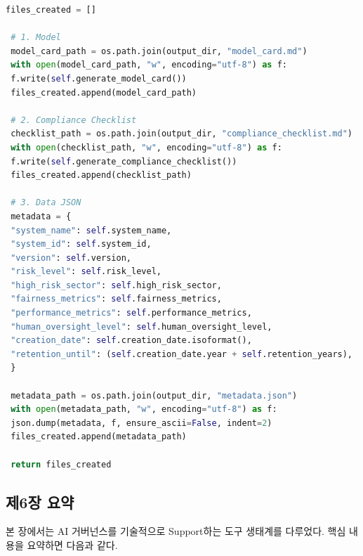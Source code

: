 \begin{lstlisting}[language=Python, caption={Integrated Documentation Automation System}, label={lst:documentation_automation}]
 files_created = []
 
 # 1. Model 
 model_card_path = os.path.join(output_dir, "model_card.md")
 with open(model_card_path, "w", encoding="utf-8") as f:
 f.write(self.generate_model_card())
 files_created.append(model_card_path)
 
 # 2. Compliance Checklist
 checklist_path = os.path.join(output_dir, "compliance_checklist.md")
 with open(checklist_path, "w", encoding="utf-8") as f:
 f.write(self.generate_compliance_checklist())
 files_created.append(checklist_path)
 
 # 3. Data JSON
 metadata = {
 "system_name": self.system_name,
 "system_id": self.system_id,
 "version": self.version,
 "risk_level": self.risk_level,
 "high_risk_sector": self.high_risk_sector,
 "fairness_metrics": self.fairness_metrics,
 "performance_metrics": self.performance_metrics,
 "human_oversight_level": self.human_oversight_level,
 "creation_date": self.creation_date.isoformat(),
 "retention_until": (self.creation_date.year + self.retention_years),
 }
 
 metadata_path = os.path.join(output_dir, "metadata.json")
 with open(metadata_path, "w", encoding="utf-8") as f:
 json.dump(metadata, f, ensure_ascii=False, indent=2)
 files_created.append(metadata_path)
 
 return files_created
\end{lstlisting}


\subsection*{제6장 요약}

본 장에서는 AI 거버넌스를 기술적으로 Support하는 도구 생태계를 다루었다. 
핵심 내용을 요약하면 다음과 같다.

